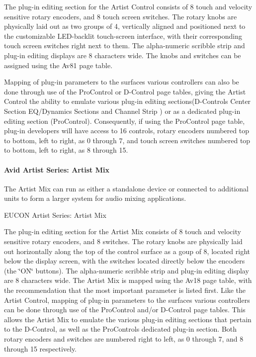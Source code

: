 The plug-\/in editing section for the Artist Control consists of 8 touch and velocity sensitive rotary encoders, and 8 touch screen switches. The rotary knobs are physically laid out as two groups of 4, vertically aligned and positioned next to the customizable L\+E\+D-\/backlit touch-\/screen interface, with their corresponding touch screen switches right next to them. The alpha-\/numeric scribble strip and plug-\/in editing displays are 8 characters wide. The knobs and switches can be assigned using the {\ttfamily Av81} page table.

Mapping of plug-\/in parameters to the surface\textquotesingle{}s various controllers can also be done through use of the Pro\+Control or D-\/\+Control page tables, giving the Artist Control the ability to emulate various plug-\/in editing sections(D-\/\+Control\textquotesingle{}s Center Section E\+Q/\+Dynamics Sections and Channel Strip ) or as a dedicated plug-\/in editing section (Pro\+Control). Consequently, if using the Pro\+Control page table, plug-\/in developers will have access to 16 controls, rotary encoders numbered top to bottom, left to right, as 0 through 7, and touch screen switches numbered top to bottom, left to right, as 8 through 15.

\hypertarget{a00363_subsubsection__avid_artist_series_mc_mix_}{}\paragraph{Avid Artist Series\+: Artist Mix}\label{a00363_subsubsection__avid_artist_series_mc_mix_}
 The Artist Mix can run as either a standalone device or connected to additional units to form a larger system for audio mixing applications.

  E\+U\+C\+O\+N Artist Series\+: Artist Mix

The plug-\/in editing section for the Artist Mix consists of 8 touch and velocity sensitive rotary encoders, and 8 switches. The rotary knobs are physically laid out horizontally along the top of the control surface as a goup of 8, located right below the display screen, with the switches located directly below the encoders (the \char`\"{}\+O\+N\char`\"{} buttons). The alpha-\/numeric scribble strip and plug-\/in editing display are 8 characters wide. The Artist Mix is mapped using the {\ttfamily Av18} page table, with the recommendation that the most important parameter is listed first. Like the Artist Control, mapping of plug-\/in parameters to the surface\textquotesingle{}s various controllers can be done through use of the Pro\+Control and/or D-\/\+Control page tables. This allows the Artist Mix to emulate the various plug-\/in editing sections that pertain to the D-\/\+Control, as well as the Pro\+Control\textquotesingle{}s dedicated plug-\/in section. Both rotary encoders and switches are numbered right to left, as 0 through 7, and 8 through 15 respectively.


